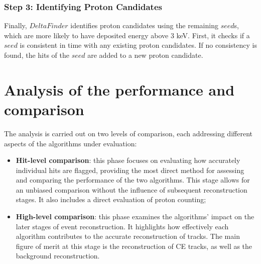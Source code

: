 \subsubsection{Step 3: Identifying Proton Candidates}
Finally, $DeltaFinder$ identifies proton candidates 
using the remaining $seed$s, which are more likely 
to have deposited energy above 3 keV. First, it checks 
if a $seed$ is consistent in time with any existing 
proton candidates. If no consistency is found, 
the hits of the $seed$ are added to a new proton candidate.


\section{Analysis of the performance and comparison}
The analysis is carried out on two levels of 
comparison, each addressing different aspects of the algorithms under evaluation:

\begin{itemize}
    \item \textbf{Hit-level comparison}: this phase focuses 
    on evaluating how accurately individual hits are 
    flagged, providing the most direct method for 
    assessing and comparing the performance of the two 
    algorithms. This stage allows for an unbiased 
    comparison without the influence of subsequent 
    reconstruction stages. It also includes a direct evaluation of proton counting;
    
    \item \textbf{High-level comparison}: this phase examines 
    the algorithms' impact on the later stages of 
    event reconstruction. It highlights how effectively 
    each algorithm contributes to the accurate reconstruction 
    of tracks. The main figure of merit at this stage is the 
    reconstruction of CE tracks, as well as the background reconstruction.
\end{itemize}

